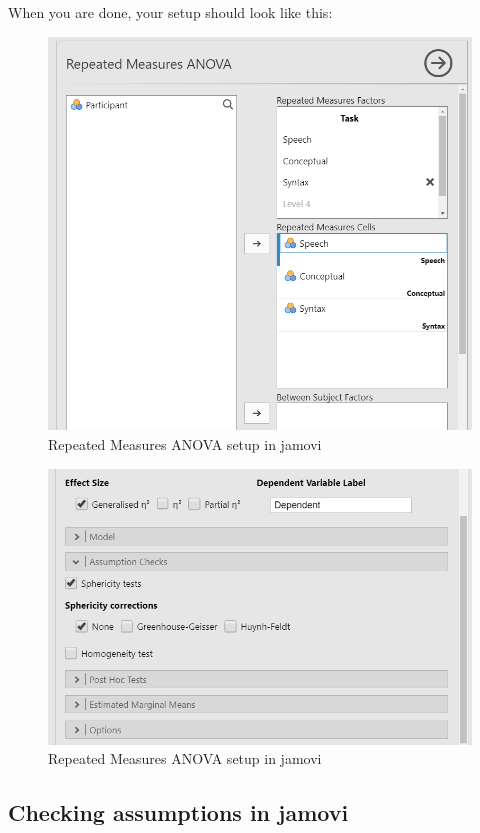 \documentclass[
]{book}
\begin{document}
When you are done, your setup should look like this:

\begin{figure}

{\centering \includegraphics[width=0.8\linewidth]{images/05-repeated-measures-anova/rm-anova_setup1} 

}

\caption{Repeated Measures ANOVA setup in jamovi}\label{fig:unnamed-chunk-4}
\end{figure}

\begin{figure}

{\centering \includegraphics[width=0.8\linewidth]{images/05-repeated-measures-anova/rm-anova_setup2} 

}

\caption{Repeated Measures ANOVA setup in jamovi}\label{fig:unnamed-chunk-5}
\end{figure}

\hypertarget{checking-assumptions-in-jamovi-3}{%
\subsection{Checking assumptions in jamovi}\label{checking-assumptions-in-jamovi-3}}
\end{document}
